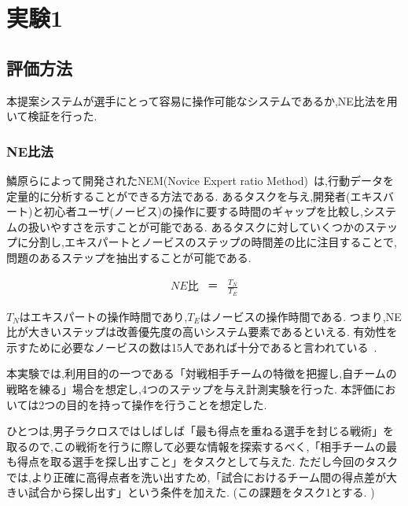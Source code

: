 \documentclass[sotsuron]{kuee}
\begin{document}
	\section{実験1}
		\subsection{評価方法}
			本提案システムが選手にとって容易に操作可能なシステムであるか,NE比法を用いて検証を行った. 
				\subsubsection{NE比法}
					鱗原らによって開発されたNEM(Novice Expert ratio Method)~\cite{NEM}は,行動データを定量的に分析することができる方法である. あるタスクを与え,開発者(エキスバート)と初心者ユーザ(ノービス)の操作に要する時間のギャップを比較し,システムの扱いやすさを示すことが可能である. 
					あるタスクに対していくつかのステップに分割し,エキスパートとノービスのステップの時間差の比に注目することで,問題のあるステップを抽出することが可能である. 

					\begin{eqnarray}
						NE比 & ＝ & \frac{T_N}{T_E}
					\end{eqnarray}
					
					$T_N$はエキスパートの操作時間であり,$T_E$はノービスの操作時間である. 
					つまり,NE比が大きいステップは改善優先度の高いシステム要素であるといえる. 
					有効性を示すために必要なノービスの数は15人であれば十分であると言われている~\cite{Nielsen}. 
					
					本実験では,利用目的の一つである「対戦相手チームの特徴を把握し,自チームの戦略を練る」場合を想定し,4つのステップを与え計測実験を行った. 
					本評価においては2つの目的を持って操作を行うことを想定した. 
					
					ひとつは,男子ラクロスではしばしば「最も得点を重ねる選手を封じる戦術」を取るので,この戦術を行うに際して必要な情報を探索するべく,「相手チームの最も得点を取る選手を探し出すこと」をタスクとして与えた. 
					ただし今回のタスクでは,より正確に高得点者を洗い出すため,「試合におけるチーム間の得点差が大きい試合から探し出す」という条件を加えた. (この課題をタスク1とする. )
					
\end{document}

